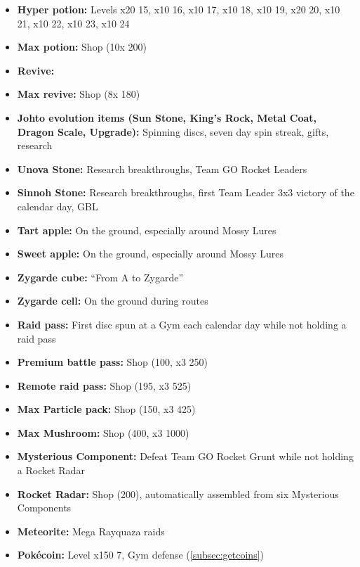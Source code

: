 \begin{itemize}
\item \textbf{Hyper potion:} Levels x20 15, x10 16, x10 17, x10 18, x10 19, x20 20, x10 21, x10 22, x10 23, x10 24
\item \textbf{Max potion:} Shop (10x 200\coin)
\item \textbf{Revive:}
\item \textbf{Max revive:} Shop (8x 180\coin)
\item \textbf{Johto evolution items (Sun Stone, King's Rock, Metal Coat, Dragon Scale, Upgrade):} Spinning discs, seven day spin streak, gifts, research
\item \textbf{Unova Stone:} Research breakthroughs, Team GO Rocket Leaders
\item \textbf{Sinnoh Stone:} Research breakthroughs, first Team Leader 3x3 victory of the calendar day, GBL
\item \textbf{Tart apple:} On the ground, especially around Mossy Lures
\item \textbf{Sweet apple:} On the ground, especially around Mossy Lures
\item \textbf{Zygarde cube:} ``From A to Zygarde''
\item \textbf{Zygarde cell:} On the ground during routes
\item \textbf{Raid pass:} First disc spun at a Gym each calendar day while not holding a raid pass
\item \textbf{Premium battle pass:} Shop (100\coin, x3 250\coin)
\item \textbf{Remote raid pass:} Shop (195\coin, x3 525\coin)
\item \textbf{Max Particle pack:} Shop (150\coin, x3 425\coin)
\item \textbf{Max Mushroom:} Shop (400\coin, x3 1000\coin)
\item \textbf{Mysterious Component:} Defeat Team GO Rocket Grunt while not holding a Rocket Radar
\item \textbf{Rocket Radar:} Shop (200\coin), automatically assembled from six Mysterious Components
\item \textbf{Meteorite:} Mega Rayquaza raids
\item \textbf{Pokécoin:} Level x150 7, Gym defense (\autoref{subsec:getcoins})
\end{itemize}
